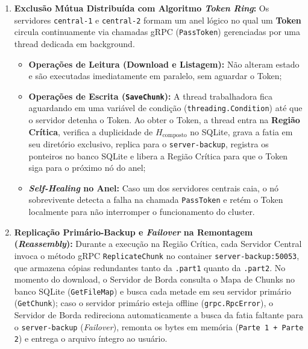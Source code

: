 \documentclass[12pt]{article}
\begin{document}
\begin{enumerate}
    \item \textbf{Exclusão Mútua Distribuída com Algoritmo \textit{Token Ring}:}
    Os servidores \texttt{central-1} e \texttt{central-2} formam um anel lógico no qual um \textbf{Token} circula continuamente via chamadas gRPC (\texttt{PassToken}) gerenciadas por uma thread dedicada em background.
    \begin{itemize}
        \item \textbf{Operações de Leitura (Download e Listagem):} Não alteram estado e são executadas imediatamente em paralelo, sem aguardar o Token;
        \item \textbf{Operações de Escrita (\texttt{SaveChunk}):} A thread trabalhadora fica aguardando em uma variável de condição (\texttt{threading.Condition}) até que o servidor detenha o Token. Ao obter o Token, a thread entra na \textbf{Região Crítica}, verifica a duplicidade de $H_{\text{composto}}$ no SQLite, grava a fatia em seu diretório exclusivo, replica para o \texttt{server-backup}, registra os ponteiros no banco SQLite e libera a Região Crítica para que o Token siga para o próximo nó do anel;
        \item \textbf{\textit{Self-Healing} no Anel:} Caso um dos servidores centrais caia, o nó sobrevivente detecta a falha na chamada \texttt{PassToken} e retém o Token localmente para não interromper o funcionamento do cluster.
    \end{itemize}

    \item \textbf{Replicação Primário-Backup e \textit{Failover} na Remontagem (\textit{Reassembly}):}
    Durante a execução na Região Crítica, cada Servidor Central invoca o método gRPC \texttt{ReplicateChunk} no container \texttt{server-backup:50053}, que armazena cópias redundantes tanto da \texttt{.part1} quanto da \texttt{.part2}. No momento do download, o Servidor de Borda consulta o Mapa de Chunks no banco SQLite (\texttt{GetFileMap}) e busca cada metade em seu servidor primário (\texttt{GetChunk}); caso o servidor primário esteja offline (\texttt{grpc.RpcError}), o Servidor de Borda redireciona automaticamente a busca da fatia faltante para o \texttt{server-backup} (\textit{Failover}), remonta os bytes em memória (\texttt{Parte 1 + Parte 2}) e entrega o arquivo íntegro ao usuário.
\end{enumerate}

\end{document}
